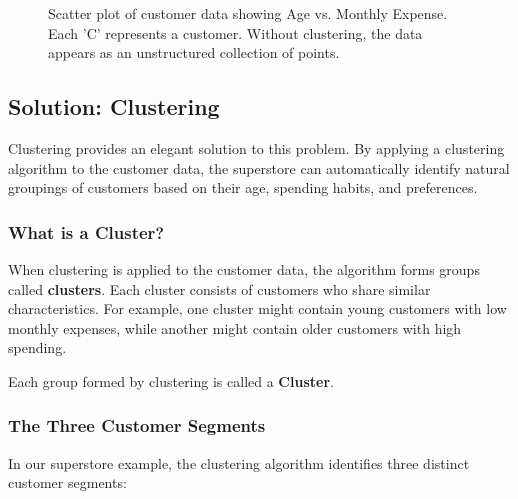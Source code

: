 \documentclass{article}
\begin{document}
\begin{figure}[H]
    \centering
    \caption{Scatter plot of customer data showing Age vs. Monthly Expense. Each 'C' represents a customer. Without clustering, the data appears as an unstructured collection of points.}
    \label{fig:scattered}
\end{figure}

\subsection{Solution: Clustering}

Clustering provides an elegant solution to this problem. By applying a clustering algorithm to the customer data, the superstore can automatically identify natural groupings of customers based on their age, spending habits, and preferences.

\subsubsection{What is a Cluster?}

When clustering is applied to the customer data, the algorithm forms groups called \textbf{clusters}. Each cluster consists of customers who share similar characteristics. For example, one cluster might contain young customers with low monthly expenses, while another might contain older customers with high spending.

\begin{tcolorbox}[title=Definition]
\centering
Each group formed by clustering is called a \textbf{Cluster}.
\end{tcolorbox}

\subsubsection{The Three Customer Segments}

In our superstore example, the clustering algorithm identifies three distinct customer segments:
\end{document}
